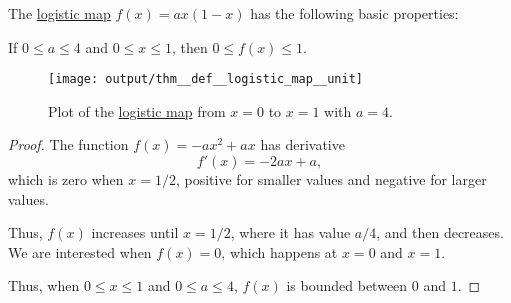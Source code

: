 \begin{proposition}\label{thm:def:logistic_map}
  The \hyperref[def:logistic_map]{logistic map} \( f(x) = a x (1 - x) \) has the following basic properties:
  \begin{thmenum}
     If \( 0 \leq a \leq 4 \) and \( 0 \leq x \leq 1 \), then \( 0 \leq f(x) \leq 1 \).

    \begin{figure}[!ht]
      \centering
      \texttt{[image: output/thm\_\_def\_\_logistic\_map\_\_unit]}
      \caption{Plot of the \hyperref[def:logistic_map]{logistic map} from \( x = 0 \) to \( x = 1 \) with \( a = 4 \).}\label{fig:thm:def:logistic_map/unit}
    \end{figure}
  \end{thmenum}
\end{proposition}
\begin{proof}
   The function \( f(x) = -ax^2 + ax \) has derivative
  \begin{equation*}
    f'(x) = -2ax + a,
  \end{equation*}
  which is zero when \( x = 1 / 2 \), positive for smaller values and negative for larger values.

  Thus, \( f(x) \) increases until \( x = 1 / 2 \), where it has value \( a / 4 \), and then decreases. We are interested when \( f(x) = 0 \), which happens at \( x = 0 \) and \( x = 1 \).

  Thus, when \( 0 \leq x \leq 1 \) and \( 0 \leq a \leq 4 \), \( f(x) \) is bounded between \( 0 \) and \( 1 \).
\end{proof}

